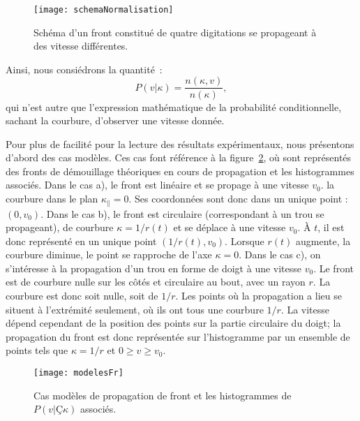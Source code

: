 \begin{figure}[!htb]
\centering
\texttt{[image: schemaNormalisation]}
\caption{Schéma d'un front constitué de quatre digitations se propageant à des vitesse différentes.}
\label{schemaNormalisation}
\end{figure}
Ainsi, nous consiédrons la quantité~:
\begin{equation}
P(v|\kappa) = \dfrac{n(\kappa,v)}{n(\kappa)},
\end{equation}
qui n'est autre que l'expression mathématique de la probabilité conditionnelle, sachant la courbure, d'observer une vitesse donnée.\par \vspace{12pt}
Pour plus de facilité pour la lecture des résultats expérimentaux, nous  présentons d'abord des cas modèles. Ces cas font référence à la figure~\ref{modelesFr}, où sont représentés des fronts de démouillage théoriques en cours de propagation et les histogrammes associés. Dans le cas a), le front est linéaire et se propage à une vitesse $v_0$. la courbure dans le plan $\kappa_\parallel = 0$. Ses coordonnées sont donc dans un unique point : $(0, v_0)$. Dans le cas b), le front est circulaire (correspondant à un trou se propageant), de courbure $\kappa =1/r(t)$ et se déplace à une vitesse $v_0$. À $t$, il est donc représenté en un unique point $(1/r(t), v_0)$. Lorsque $r(t)$ augmente, la courbure diminue, le point se rapproche de l'axe $\kappa = 0$. Dans le cas c), on s'intéresse à la propagation d'un trou en forme de doigt à une vitesse $v_0$. Le front est de courbure nulle sur les côtés et circulaire au bout, avec un rayon $r$. La courbure est donc soit nulle, soit de $1/r$. Les points où la propagation a lieu se situent à l'extrémité seulement, où ils ont tous une courbure $1/r$. La vitesse dépend cependant de la position des points sur la partie circulaire du doigt; la propagation du front est donc représentée sur l'histogramme par un ensemble de points tels que $\kappa = 1/r$ et $0 \geq v \geq v_0$.\par 

\begin{figure}[!htb]
\centering
\texttt{[image: modelesFr]}
\caption{Cas modèles de propagation de front et les histogrammes de $P(v|Ç\kappa)$ associés.}
\label{modelesFr}
\end{figure}

